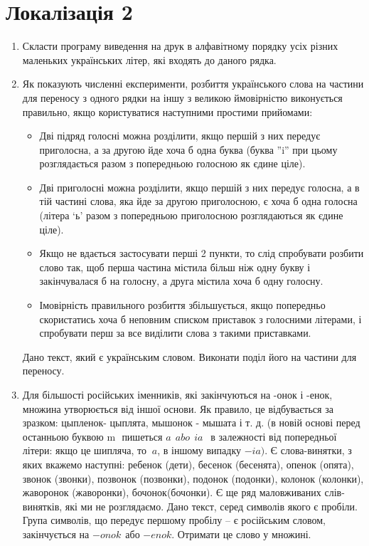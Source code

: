 \documentclass[]{article}
\begin{document}
\section{Локалізація 2}
\begin{enumerate}
\item
Скласти програму виведення на друк в алфавітному порядку усіх різних
маленьких українських літер, які входять до даного рядка.
\item
Як показують численні експерименти, розбиття українського слова на
частини для переносу з одного рядки на іншу з великою ймовірністю
виконується правильно, якщо користуватися наступними простими прийомами:
 \begin{itemize}
\item
Дві підряд голосні можна розділити, якщо першій з них передує
приголосна, а за другою йде хоча б одна буква (буква
''i'' при цьому розглядається разом з попередньою голосною як
єдине ціле).
\item
Дві  приголосні можна розділити, якщо першій з них передує
голосна, а в тій частині слова, яка йде за другою приголосною, є хоча б
одна голосна (літера `ь' разом з попередньою приголосною розглядаються
як єдине ціле).
\item
Якщо не вдається застосувати перші 2 пункти, то слід спробувати розбити
слово так, щоб перша частина містила більш ніж одну букву і
закінчувалася б на голосну, а друга містила хоча б одну голосну.
\item
Імовірність правильного розбиття збільшується, якщо попередньо
скористатись хоча б неповним списком приставок з голосними літерами, і
спробувати перш за все виділити слова з такими приставками.
 \end{itemize}
Дано текст, який є українським словом. Виконати поділ його на частини
для переносу.
\item
Для більшості російських іменників, які закінчуються на -онок і -енок,
множина утворюється від іншої основи. Як правило, це відбувається за
зразком: цыпленок- цыплята, мышонок - мышата і т. д. (в новій основі
перед останньою буквою \(\text{m\ }\) пишеться \(a\ \ abo\ \ ia\ \ \) в
залежності від попередньої літери: якщо це шипляча, то \(\ a\), в іншому
випадку \(- ia)\). Є слова-винятки, з яких вкажемо наступні: ребенок
(дети), бесенок (бесенята), опенок (опята), звонок (звонки), позвонок
(позвонки), подонок (подонки), колонок (колонки), жаворонок (жаворонки),
бочонок(бочонки). Є ще ряд маловживаних слів-винятків, які ми не
розглядаємо. Дано текст, серед символів якого є пробіли. Група символів,
що передує першому пробілу -- є російським словом, закінчується на
\(- onok\ \ \)або \(- enok\). Отримати це слово у множині.
\end{enumerate}
\end{document}
